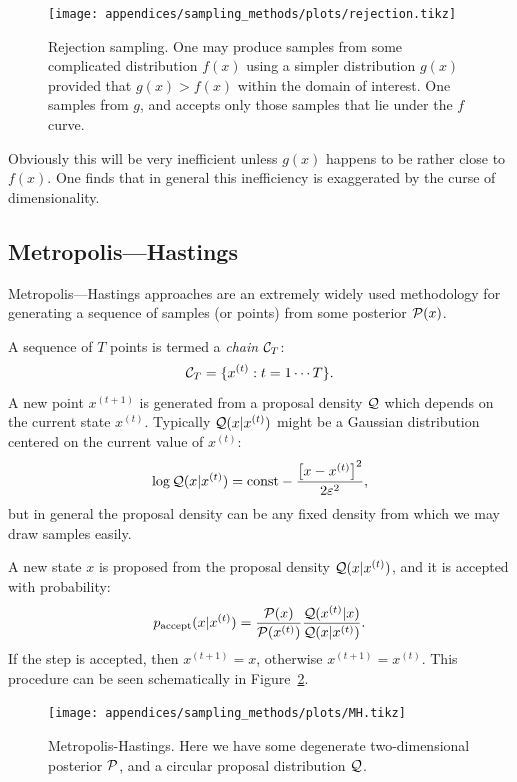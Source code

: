 \begin{figure}[tp]
  \centering
  \texttt{[image: appendices/sampling\_methods/plots/rejection.tikz]}
  \caption{Rejection sampling. One may produce samples from some complicated distribution \(f(x)\) using a simpler distribution \(g(x)\) provided that \(g(x)>f(x)\) within the domain of interest. One samples from \(g\), and accepts only those samples that lie under the \(f\) curve.}\label{fig:sm:rej}
\end{figure}

Obviously this will be very inefficient unless \(g(x)\) happens to be rather close to \(f(x)\). One finds that in general this inefficiency is exaggerated by the curse of dimensionality.

\subsection{Metropolis---Hastings}
\label{sec:sm:mh}
Metropolis---Hastings approaches are an extremely widely used methodology for generating a sequence of samples (or points) from some posterior \(\mathcal{P}(x)\).

A sequence of \(T\) points is termed a {\em chain\/} \(\mathcal{C}_T\):
\begin{equation}
  \mathcal{C}_T = \{ x^{(t)}: t=1\cdots T \}.
\end{equation}
A new point \(x^{(t+1)}\) is generated from a proposal density \(\mathcal{Q}\) which depends on the current state \(x^{(t)}\). Typically \(\mathcal{Q}(x|x^{(t)})\) might be a Gaussian distribution centered on the current value of \(x^{(t)}\):
\begin{equation}
  \log \mathcal{Q}(x|x^{(t)}) = \text{const} -\frac{{\left[ x-x^{(t)} \right]}^2}{2\varepsilon^2},
\end{equation}
but in general the proposal density can be any fixed density from which we may draw samples easily.

A new state \(x\) is proposed from the proposal density \(\mathcal{Q}(x|x^{(t)})\), and it is accepted with probability:
\begin{equation}
  p_\mathrm{accept}(x|x^{(t)}) = \frac{\mathcal{P}(x)}{\mathcal{P}(x^{(t)})}\frac{\mathcal{Q}(x^{(t)}|x)}{\mathcal{Q}(x|x^{(t)})}.
\end{equation}
If the step is accepted, then \(x^{(t+1)}=x\), otherwise \(x^{(t+1)} = x^{(t)}\). This procedure can be seen schematically in Figure~\ref{fig:sm:MH}.
\begin{figure}[tp]
  \centering
  \texttt{[image: appendices/sampling\_methods/plots/MH.tikz]}
  \caption{Metropolis-Hastings. Here we have some degenerate two-dimensional posterior \(\mathcal{P}\), and a circular proposal distribution \(\mathcal{Q}\).}\label{fig:sm:MH}
\end{figure}


